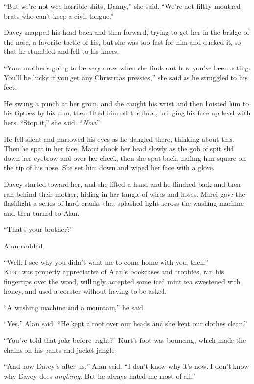 ``But we're not wee horrible shits, Danny,'' she said.  ``We're not
filthy-mouthed brats who can't keep a civil tongue.''

Davey snapped his head back and then forward, trying to get her in the
bridge of the nose, a favorite tactic of his, but she was too fast for
him and ducked it, so that he stumbled and fell to his knees.

``Your mother's going to be very cross when she finds out how you've
been acting.  You'll be lucky if you get any Christmas pressies,'' she
said as he struggled to his feet.

He swung a punch at her groin, and she caught his wrist and then
hoisted him to his tiptoes by his arm, then lifted him off the floor,
bringing his face up level with hers.  ``Stop it,'' she said. 
``\textit{Now}.''

He fell silent and narrowed his eyes as he dangled there, thinking
about this.  Then he spat in her face.  Marci shook her head slowly as
the gob of spit slid down her eyebrow and over her cheek, then she
spat back, nailing him square on the tip of his nose.  She set him
down and wiped her face with a glove.

Davey started toward her, and she lifted a hand and he flinched back
and then ran behind their mother, hiding in her tangle of wires and
hoses.  Marci gave the flashlight a series of hard cranks that
splashed light across the washing machine and then turned to Alan.

``That's your brother?''

Alan nodded.

``Well, I see why you didn't want me to come home with you, then.''
\\
\lettrine[lines=3, lhang=.5, nindent=0pt, findent=2pt]{K}{urt} was properly appreciative of Alan's bookcases and trophies, ran
his fingertips over the wood, willingly accepted some iced mint tea
sweetened with honey, and used a coaster without having to be asked.

``A washing machine and a mountain,'' he said.

``Yes,'' Alan said.  ``He kept a roof over our heads and she kept our
clothes clean.''

``You've told that joke before, right?'' Kurt's foot was bouncing,
which made the chains on his pants and jacket jangle.

``And now Davey's after us,'' Alan said.  ``I don't know why it's now. 
I don't know why Davey does \textit{anything}.  But he always hated me
most of all.''

